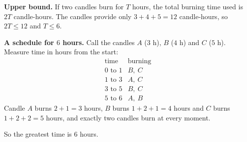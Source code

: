 \textbf{Upper bound.} If two candles burn for $T$ hours, the total burning time used is $2T$ candle-hours. The candles provide only $3+4+5=12$ candle-hours, so $2T\le12$ and $T\le6$.

\textbf{A schedule for $6$ hours.} Call the candles $A$ ($3$ h), $B$ ($4$ h) and $C$ ($5$ h). Measure time in hours from the start:
\[
\begin{array}{c|c}
\text{time} & \text{burning}\\\hline
0\text{ to }1 & B,\ C\\
1\text{ to }3 & A,\ C\\
3\text{ to }5 & B,\ C\\
5\text{ to }6 & A,\ B
\end{array}
\]
Candle $A$ burns $2+1=3$ hours, $B$ burns $1+2+1=4$ hours and $C$ burns $1+2+2=5$ hours, and exactly two candles burn at every moment.

So the greatest time is $\boxed{6}$ hours.
